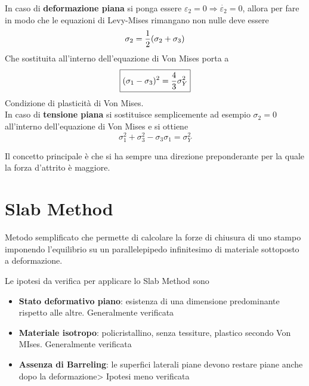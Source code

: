 \documentclass[a4paper, 15pt]{article}
\newcommand{\compresslist}{ %
			\setlength{\itemsep}{1pt}
			\setlength{\parskip}{0pt}
			\setlength{\parsep}{0pt}
		}
\begin{document}
	 In caso di \textbf{deformazione piana} si ponga essere $\varepsilon_2=0 \Rightarrow\dot{\varepsilon_2}=0$, allora per fare in modo che le equazioni di Levy-Mises rimangano non nulle deve essere 
	 \[\sigma_2 = {1\over2}(\sigma_2+\sigma_3)\]
	 Che sostituita all'interno dell'equazione di Von Mises porta a 
	 \begin{equation}\label{eq:VM}
	 	\boxed{(\sigma_1-\sigma_3)^2 = {4\over3}\sigma^2_Y}
	 \end{equation}
	 Condizione di plasticità di Von Mises.\\
	 
	 In caso di \textbf{tensione piana} si sostituisce semplicemente ad esempio $\sigma_2 = 0$ all'interno dell'equazione di Von Mises e si ottiene
	 \[\sigma_1^2+\sigma_3^2-\sigma_3\sigma_1 = \sigma_Y^2\]
	 
	 Il concetto principale è che si ha sempre una direzione preponderante per la quale la forza d'attrito è maggiore. 
	 
	 \section{Slab Method}
	 Metodo semplificato che permette di calcolare la forze di chiusura di uno stampo imponendo l'equilibrio su un parallelepipedo infinitesimo di materiale sottoposto a deformazione. 
	 
	 Le ipotesi da verifica per applicare lo Slab Method sono
	 \begin{itemize}\compresslist
	 	\item \textbf{Stato deformativo piano}: esistenza di una dimensione predominante rispetto alle altre. Generalmente verificata
	 	\item \textbf{Materiale isotropo}: policristallino, senza tessiture, plastico secondo Von MIses. Generalmente verificata
	 	\item \textbf{Assenza di Barreling}: le superfici laterali piane devono restare piane anche dopo la deformazione> Ipotesi meno verificata
	 \end{itemize}
\end{document}
